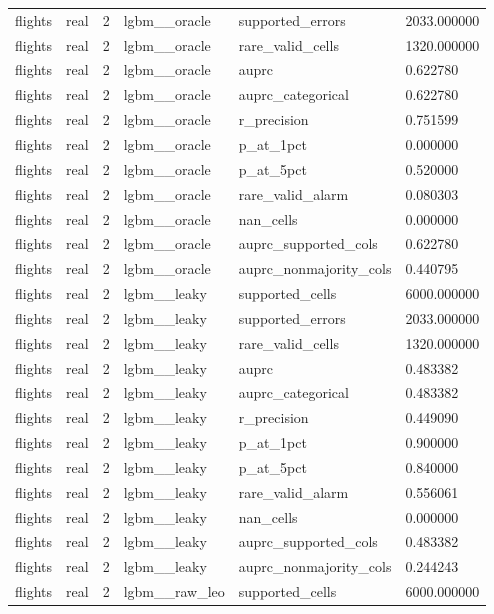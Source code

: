 \begin{tabular}{llllll}
flights & real & 2 & lgbm\_\_oracle & supported\_errors & 2033.000000 \\
flights & real & 2 & lgbm\_\_oracle & rare\_valid\_cells & 1320.000000 \\
flights & real & 2 & lgbm\_\_oracle & auprc & 0.622780 \\
flights & real & 2 & lgbm\_\_oracle & auprc\_categorical & 0.622780 \\
flights & real & 2 & lgbm\_\_oracle & r\_precision & 0.751599 \\
flights & real & 2 & lgbm\_\_oracle & p\_at\_1pct & 0.000000 \\
flights & real & 2 & lgbm\_\_oracle & p\_at\_5pct & 0.520000 \\
flights & real & 2 & lgbm\_\_oracle & rare\_valid\_alarm & 0.080303 \\
flights & real & 2 & lgbm\_\_oracle & nan\_cells & 0.000000 \\
flights & real & 2 & lgbm\_\_oracle & auprc\_supported\_cols & 0.622780 \\
flights & real & 2 & lgbm\_\_oracle & auprc\_nonmajority\_cols & 0.440795 \\
flights & real & 2 & lgbm\_\_leaky & supported\_cells & 6000.000000 \\
flights & real & 2 & lgbm\_\_leaky & supported\_errors & 2033.000000 \\
flights & real & 2 & lgbm\_\_leaky & rare\_valid\_cells & 1320.000000 \\
flights & real & 2 & lgbm\_\_leaky & auprc & 0.483382 \\
flights & real & 2 & lgbm\_\_leaky & auprc\_categorical & 0.483382 \\
flights & real & 2 & lgbm\_\_leaky & r\_precision & 0.449090 \\
flights & real & 2 & lgbm\_\_leaky & p\_at\_1pct & 0.900000 \\
flights & real & 2 & lgbm\_\_leaky & p\_at\_5pct & 0.840000 \\
flights & real & 2 & lgbm\_\_leaky & rare\_valid\_alarm & 0.556061 \\
flights & real & 2 & lgbm\_\_leaky & nan\_cells & 0.000000 \\
flights & real & 2 & lgbm\_\_leaky & auprc\_supported\_cols & 0.483382 \\
flights & real & 2 & lgbm\_\_leaky & auprc\_nonmajority\_cols & 0.244243 \\
flights & real & 2 & lgbm\_\_raw\_leo & supported\_cells & 6000.000000 \\

\end{tabular}
